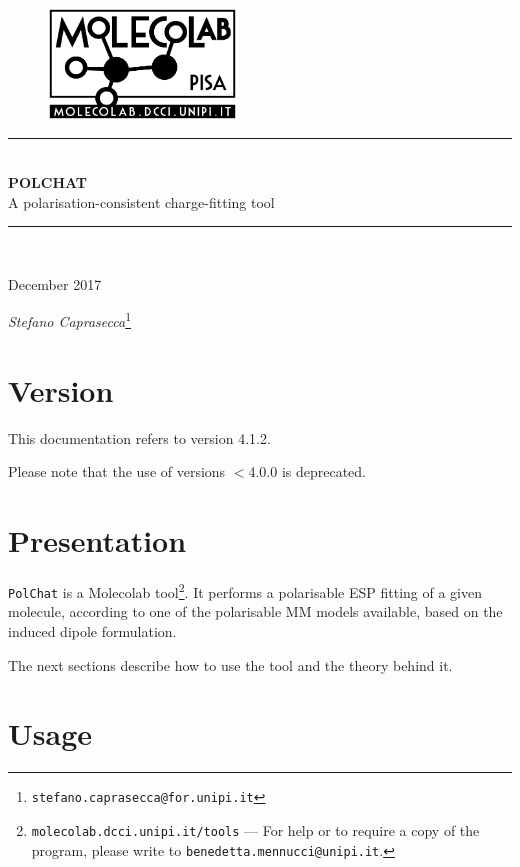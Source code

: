 \documentclass[a4paper]{report}
\begin{document}
\Large
\begin{center}
\begin{figure}[h!]
\centering
\includegraphics[width=5cm]{logo.png}
\end{figure}
\noindent\rule{\textwidth}{0.4pt} \\
\textbf{POLCHAT} \\ A polarisation-consistent charge-fitting tool 
\noindent\rule{\textwidth}{0.4pt} \\
\end{center}
\begin{flushright}\footnotesize{December 2017}\end{flushright}
\normalsize
\begin{center}
\emph{Stefano Caprasecca}\footnote{\texttt{stefano.caprasecca@for.unipi.it}}
\end{center}

\section*{Version}

This documentation refers to version 4.1.2.

Please note that the use of versions $<$4.0.0 is deprecated.

\section*{Presentation}

\texttt{PolChat} is a Molecolab tool\footnote{\texttt{molecolab.dcci.unipi.it/tools} --- For help or to require a copy of the program, please write to
\texttt{benedetta.mennucci@unipi.it}.}. It performs a
polarisable ESP fitting of a given molecule, according to one of the polarisable MM models available, based on the induced dipole formulation.

The next sections describe how to use the tool and the theory behind it.

\section*{Usage}
\end{document}
